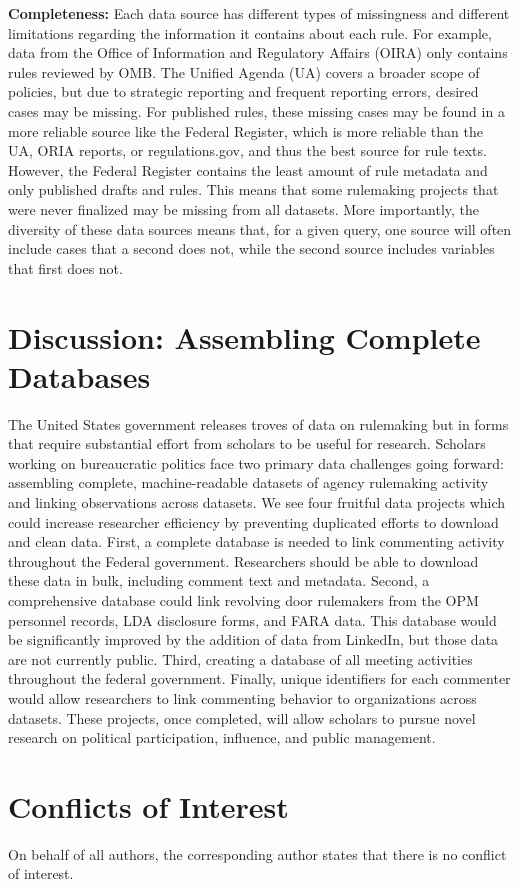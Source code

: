 \documentclass[
      12pt,
        ]{article}
\begin{document}
\textbf{Completeness:} Each data source has different types of
missingness and different limitations regarding the information it
contains about each rule. For example, data from the Office of
Information and Regulatory Affairs (OIRA) only contains rules reviewed
by OMB. The Unified Agenda (UA) covers a broader scope of policies, but
due to strategic reporting and frequent reporting errors, desired cases
may be missing. For published rules, these missing cases may be found in
a more reliable source like the Federal Register, which is more reliable
than the UA, ORIA reports, or regulations.gov, and thus the best source
for rule texts. However, the Federal Register contains the least amount
of rule metadata and only published drafts and rules. This means that
some rulemaking projects that were never finalized may be missing from
all datasets. More importantly, the diversity of these data sources
means that, for a given query, one source will often include cases that
a second does not, while the second source includes variables that first
does not.

\hypertarget{discussion-assembling-complete-databases}{%
\section{Discussion: Assembling Complete
Databases}\label{discussion-assembling-complete-databases}}

The United States government releases troves of data on rulemaking but
in forms that require substantial effort from scholars to be useful for
research. Scholars working on bureaucratic politics face two primary
data challenges going forward: assembling complete, machine-readable
datasets of agency rulemaking activity and linking observations across
datasets. We see four fruitful data projects which could increase
researcher efficiency by preventing duplicated efforts to download and
clean data. First, a complete database is needed to link commenting
activity throughout the Federal government. Researchers should be able
to download these data in bulk, including comment text and metadata.
Second, a comprehensive database could link revolving door rulemakers
from the OPM personnel records, LDA disclosure forms, and FARA data.
This database would be significantly improved by the addition of data
from LinkedIn, but those data are not currently public. Third, creating
a database of all meeting activities throughout the federal government.
Finally, unique identifiers for each commenter would allow researchers
to link commenting behavior to organizations across datasets. These
projects, once completed, will allow scholars to pursue novel research
on political participation, influence, and public management.

\hypertarget{conflicts-of-interest}{%
\section{Conflicts of Interest}\label{conflicts-of-interest}}

On behalf of all authors, the corresponding author states that there is
no conflict of interest.
  \newpage 
  \theendnotes
\newpage
\singlespacing 
           
  
\end{document}

